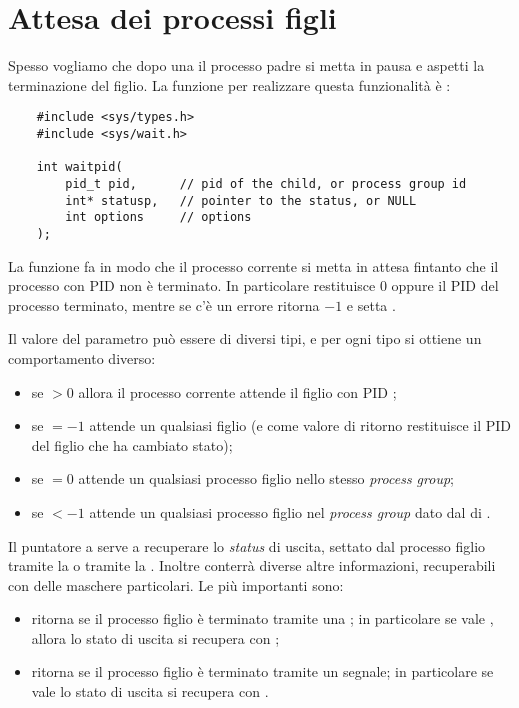 \section{Attesa dei processi figli}

Spesso vogliamo che dopo una  il processo padre si metta in pausa e aspetti la terminazione del figlio. La funzione per realizzare questa funzionalità è :
\begin{verbatim}
    #include <sys/types.h>
    #include <sys/wait.h>

    int waitpid(
        pid_t pid,      // pid of the child, or process group id
        int* statusp,   // pointer to the status, or NULL
        int options     // options
    );
\end{verbatim}

La funzione  fa in modo che il processo corrente si metta in attesa fintanto che il processo con \textsf{PID}  non è terminato. In particolare  restituisce $0$ oppure il \textsf{PID} del processo terminato, mentre se c'è un errore ritorna $-1$ e setta .

Il valore del parametro  può essere di diversi tipi, e per ogni tipo si ottiene un comportamento diverso:
\begin{itemize}
    \item se  $ > 0$ allora il processo corrente attende il figlio con \textsf{PID} ;
    \item se  $= -1$ attende un qualsiasi figlio (e come valore di ritorno restituisce il \textsf{PID} del figlio che ha cambiato stato);
    \item se  $= 0$ attende un qualsiasi processo figlio nello stesso \emph{process group};
    \item se  $< -1$ attende un qualsiasi processo figlio nel \emph{process group} dato dal  di .
\end{itemize}

Il puntatore a  serve a recuperare lo \emph{status} di uscita, settato dal processo figlio tramite la  o tramite la . Inoltre  conterrà diverse altre informazioni, recuperabili con delle maschere particolari. Le più importanti sono:
\begin{itemize}
    \item {} ritorna  se il processo figlio è terminato tramite una ; 
    in particolare se vale , allora lo stato di uscita si recupera con ;
    \item {} ritorna  se il processo figlio è terminato tramite un segnale; 
    in particolare se vale  lo stato di uscita si recupera con .
\end{itemize}

